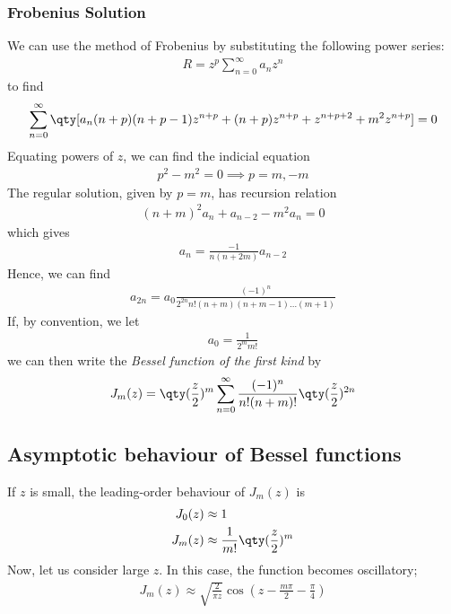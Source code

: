 \subsubsection{Frobenius Solution}
We can use the method of Frobenius by substituting the following power series:
\begin{align*}
	R = z^p \sum_{n=0}^\infty a_n z^n
\end{align*}
to find
\begin{align*}
	\sum_{n=0}^\infty \qty[ a_n (n+p)(n+p-1) z^{n+p} + (n+p) z^{n+p} + z^{n+p+2} + m^2 z^{n+p} ] = 0
\end{align*}
Equating powers of $z$, we can find the indicial equation
\begin{align*}
	p^2 - m^2 = 0 \implies p = m, -m
\end{align*}
The regular solution, given by $p = m$, has recursion relation
\begin{align*}
	(n+m)^2 a_n + a_{n-2} - m^2 a_n = 0
\end{align*}
which gives
\begin{align*}
	a_n = \frac{-1}{n(n+2m)} a_{n-2}
\end{align*}
Hence, we can find
\begin{align*}
	a_{2n} = a_0 \frac{(-1)^n}{2^{2n} n!
		(n+m)(n+m-1) \dots (m+1)}
\end{align*}
If, by convention, we let
\begin{align*}
	a_0 = \frac{1}{2^m m!}
\end{align*}
we can then write the \textit{Bessel function of the first kind} by
\begin{align*}
	J_m(z) = \qty(\frac{z}{2})^m \sum_{n=0}^\infty \frac{(-1)^n}{n!
		(n+m)!} \qty(\frac{z}{2})^{2n}
\end{align*}

\subsection{Asymptotic behaviour of Bessel functions}
If $z$ is small, the leading-order behaviour of $J_m(z)$ is
\begin{align*}
	J_0(z) & \approx 1                                \\
	J_m(z) & \approx \frac{1}{m!} \qty(\frac{z}{2})^m
\end{align*}
Now, let us consider large $z$.
In this case, the function becomes oscillatory;
\begin{align*}
	J_m(z) \approx \sqrt{\frac{2}{\pi z}} \cos(z - \frac{m \pi}{2} - \frac{\pi}{4})
\end{align*}

